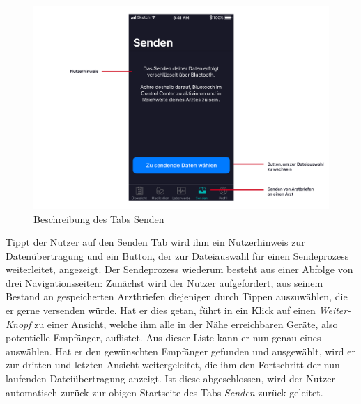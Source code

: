 \documentclass[a4paper]{scrreprt}
\begin{document}
\begin{figure}[H]
\centering
\includegraphics[width=1\textwidth]{graphics/UIDescriptions/SendDataDesc}
\caption{Beschreibung des Tabs \dq Senden\dq{}}
\vspace{0.5cm}
\end{figure}
Tippt der Nutzer auf den \dq Senden\dq{} Tab wird ihm ein Nutzerhinweis zur Datenübertragung und ein Button, der zur Dateiauswahl für einen Sendeprozess weiterleitet, angezeigt.
Der Sendeprozess wiederum besteht aus einer Abfolge von drei Navigationsseiten:
Zunächst wird der Nutzer aufgefordert, aus seinem Bestand an gespeicherten Arztbriefen diejenigen durch Tippen auszuwählen, die er gerne versenden würde.
Hat er dies getan, führt in ein Klick auf einen \textit{Weiter-Knopf} zu einer Ansicht, welche ihm alle in der Nähe erreichbaren Geräte, also potentielle Empfänger, auflistet. Aus dieser Liste kann er nun genau eines auswählen. Hat er den gewünschten Empfänger gefunden und ausgewählt, wird er zur dritten und letzten Ansicht weitergeleitet, die ihm den Fortschritt der nun laufenden Dateiübertragung anzeigt.
Ist diese abgeschlossen, wird der Nutzer automatisch zurück zur obigen Startseite des Tabs \textit{Senden} zurück geleitet.
\end{document}
